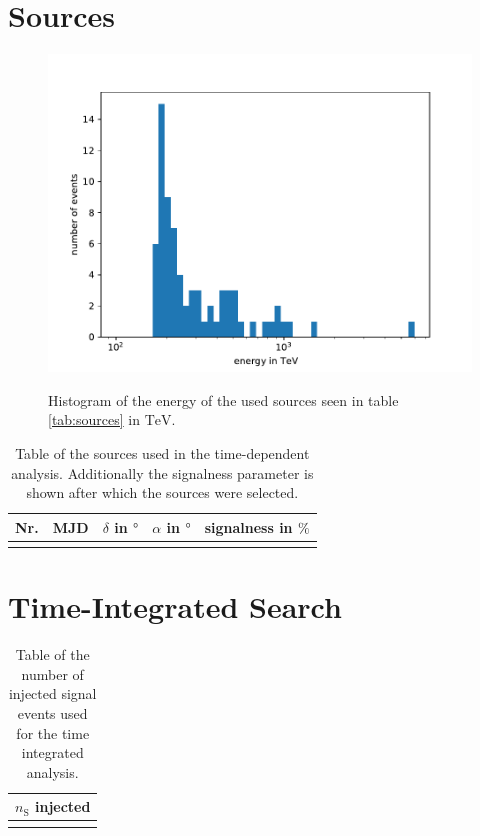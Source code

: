 \section{Sources}

\begin{figure}
    \centering
    \includegraphics[width=\linewidth]{Plots/appendix/sources_energy.pdf}
    \label{fig:sources_energy}
    \caption{Histogram of the energy of the used sources seen in table \ref{tab:sources} in $\si{\tera\electronvolt}$.}
\end{figure}

\begin{table}
  \centering
  \caption{Table of the sources used in the time-dependent analysis. Additionally the signalness parameter is shown after which the sources were selected.}
  \begin{tabular}{ccrrc}
    \toprule
    Nr. & MJD &  $\delta$ in $\si{\degree}$ & $\alpha$ in $\si{\degree}$ & signalness in $\si{\percent}$ \\
    \toprule
      
    \toprule
    \label{tab:sources_time_dep}
  \end{tabular}
\end{table}

\section{Time-Integrated Search}

\begin{table}
  \centering
  \caption{Table of the number of injected signal events used for the time integrated analysis.}
  \begin{tabular}{r}
    \toprule
    $n_\text{S}$ injected \\
    \toprule
      
    \toprule
    \label{tab:sig_time_int_table}
  \end{tabular}
\end{table}

